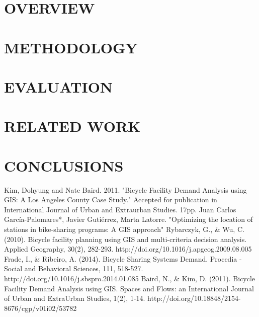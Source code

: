 \documentclass[journal, letterpaper]{IEEEtran}
\begin{document}
\section{OVERVIEW}
\large

\section{METHODOLOGY}
\large

\section{EVALUATION}
\large

\section{RELATED WORK}
\large

\section{CONCLUSIONS}
\large

\begin{thebibliography}{99}

 Kim, Dohyung and Nate Baird. 2011. "Bicycle Facility Demand Analysis using GIS: A Los Angeles County Case Study." Accepted for publication in International Journal of Urban and Extraurban Studies. 17pp.
 Juan Carlos García-Palomares*, Javier Gutiérrez, Marta Latorre. "Optimizing the location of stations in bike-sharing programs: A GIS approach"
 Rybarczyk, G., \& Wu, C. (2010). Bicycle facility planning using GIS and multi-criteria decision analysis. Applied Geography, 30(2), 282-293. http://doi.org/10.1016/j.apgeog.2009.08.005
 Frade, I., \& Ribeiro, A. (2014). Bicycle Sharing Systems Demand. Procedia - Social and Behavioral Sciences, 111, 518-527. http://doi.org/10.1016/j.sbspro.2014.01.085
 Baird, N., \& Kim, D. (2011). Bicycle Facility Demand Analysis using GIS. Spaces and Flows: an International Journal of Urban and ExtraUrban Studies, 1(2), 1-14. http://doi.org/10.18848/2154-8676/cgp/v01i02/53782
 
\end{thebibliography}
\end{document}
